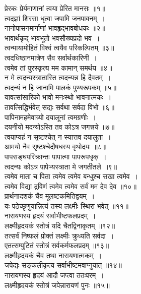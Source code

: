 \documentclass[twoside,top=1.7cm, bottom=1.7cm, outer=1cm,landscape, inner=1.5cm,a5paper,]{book}
\begin{document}
\begin{center}
प्रेरकः प्रेर्यमाणानां त्वया प्रेरित मानसः ॥१॥\\[10pt]
त्वदज्ञां शिरसा धृत्वा जपामि जनपावनम्~।\\
नानोपासनमार्गाणां भावहृद्भावबोधकः ॥२॥\\[10pt]
भावार्थकृद् भावभूतो भवसौख्यप्रदो भव~।\\
त्वन्मायामोहितं विश्वं त्वयैव परिकल्पितम् ॥३॥\\[10pt]
त्वदधिष्ठानमात्रेण सैव सर्वार्थकारिणी~।\\
त्वमेव तां पुरस्कृत्य मम कामान् समर्थय ॥४॥\\[10pt]
न मे त्वदन्यस्त्रातास्ति त्वदन्यन्न हि दैवतम्~।\\
त्वदन्यं न हि जानामि पालकं पुण्यरूपकम् ॥५॥\\[10pt]
यावत्सांसारिको भावो मनःस्थो भावनात्मकः~।\\
तावत्सिद्धिर्भवेत् सद्यः सर्वथा सर्वदा विभो ॥६॥\\[10pt]
\newpage
पापिनामहमेवाग्र्यो दयालूनां त्वमग्रणीः~।\\
दयनीयो मदन्योऽस्ति तव कोऽत्र जगत्त्रये ॥७॥\\[10pt]
त्वयाप्यहं न सृष्टश्चेत् न स्यात्तव दयालुता~।\\
आमयो नैव सृष्टश्चेदौषधस्य वृथोदयः ॥८॥\\[10pt]
पापसङ्घपरिक्रान्तः पापात्मा पापरूपधृक्~।\\
त्वदन्यः कोऽत्र पापेभ्यस्त्राता मे जगतीतले ॥९॥\\[10pt]
त्वमेव माता च पिता त्वमेव त्वमेव बन्धुश्च सखा त्वमेव~।\\
त्वमेव विद्या द्रविणं त्वमेव त्वमेव सर्वं मम देव देव ॥१०॥\\[10pt]
\newpage
प्रार्थनादशकं चैव मूलष्टकमितिद्वयम्~।\\
यः पठेच्छृणुयान्नित्यं तस्य लक्ष्मीः स्थिरा भवेत् ॥११॥\\[10pt]
नारायणस्य हृदयं सर्वाभीष्टफलप्रदम्~।\\
लक्ष्मीहृदयकं स्तोत्रं यदि चैतद्विनाकृतम् ॥१२॥\\[10pt]
तत्सर्वं निष्फलं प्रोक्तं लक्ष्मीः क्रुध्यति सर्वदा~।\\
एतत्सम्पुटितं स्तोत्रं सर्वकर्मफलप्रदम् ॥१३॥\\[10pt]
लक्ष्मीहृदयकं चैव तथा नारायणात्मकम्~।\\
जपेद्यः सङ्कलीकृत्य सर्वाभीष्टमवाप्नुयात् ॥१४॥\\[10pt]
\newpage
नारायणस्य हृदयं आदौ जप्त्वा ततःपरम्~।\\
लक्ष्मीहृदयकं स्तोत्रं जपेन्नारायणं पुनः ॥१५॥\\[10pt]

\end{center}
\end{document}

